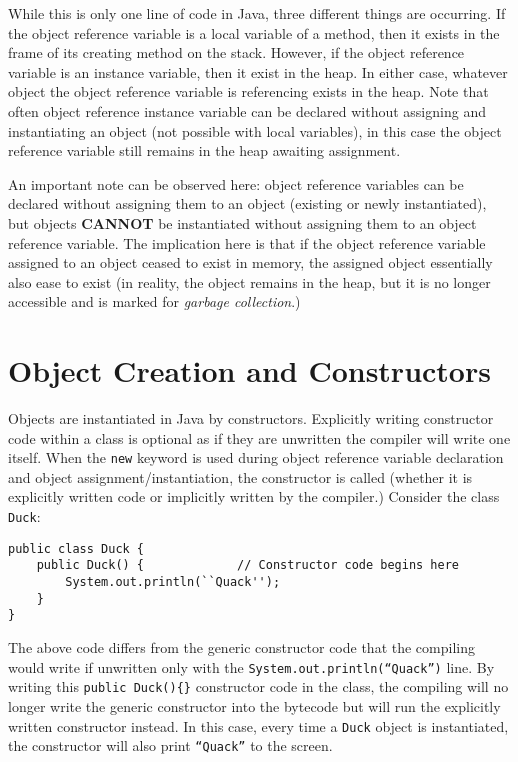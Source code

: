 \documentclass{tufte-handout}
\begin{document}
\begin{itemize}
        While this is only one line of code in Java, three different things are occurring. If the object reference variable is a local variable of a method, then it exists in the frame of its creating method on the stack. However, if the object reference variable is an instance variable, then it exist in the heap. In either case, whatever object the object reference variable is referencing exists in the heap. Note that often object reference instance variable can be declared without assigning and instantiating an object (not possible with local variables), in this case the object reference variable still remains in the heap awaiting assignment. 

        An important note can be observed here: object reference variables can be declared without assigning them to an object (existing or newly instantiated), but objects \textbf{CANNOT} be instantiated without assigning them to an object reference variable. The implication here is that if the object reference variable assigned to an object ceased to exist in memory, the assigned object essentially also ease to exist (in reality, the object remains in the heap, but it is no longer accessible and is marked for \emph{garbage collection}.)

        \end{itemize}

    \section*{Object Creation and Constructors}
    Objects are instantiated in Java by constructors. Explicitly writing constructor code within a class is optional as if they are unwritten the compiler will write one itself. When the \texttt{new} keyword is used during object reference variable declaration and object assignment/instantiation, the constructor is called (whether it is explicitly written code or implicitly written by the compiler.) Consider the class \texttt{Duck}:

    \begin{lstlisting}
public class Duck {
    public Duck() {             // Constructor code begins here
        System.out.println(``Quack'');
    }
}
    \end{lstlisting}

    The above code differs from the generic constructor code that the compiling would write if unwritten only with the \texttt{System.out.println(``Quack'')} line. By writing this \texttt{public Duck()\{\}} constructor code in the class, the compiling will no longer write the generic constructor into the bytecode but will run the explicitly written constructor instead. In this case, every time a \texttt{Duck} object is instantiated, the constructor will also print \texttt{``Quack''} to the screen.
\end{document}
